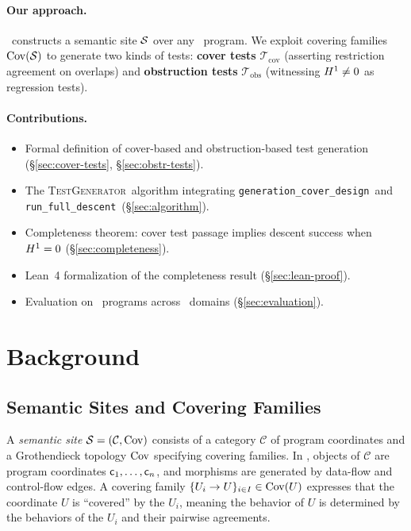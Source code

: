 \documentclass[11pt]{article}
\newcommand{\TestGen}{\textsc{TestGenerator}}
\newcommand{\GenCoverDesign}{\texttt{generation\_cover\_design}}
\newcommand{\RunDescent}{\texttt{run\_full\_descent}}
\newcommand{\CoverSuite}{\mathcal{T}_{\mathrm{cov}}}
\newcommand{\ObstrSuite}{\mathcal{T}_{\mathrm{obs}}}
\begin{document}
\paragraph{Our approach.}
\JuGeo\ constructs a semantic site $\mathcal{S}$ over any \Python\ program.
We exploit covering families $\mathrm{Cov}(\mathcal{S})$ to generate two kinds of tests:
\textbf{cover tests} $\CoverSuite$ (asserting restriction agreement on
overlaps) and \textbf{obstruction tests} $\ObstrSuite$ (witnessing
$H^{1} \neq 0$ as regression tests).

\paragraph{Contributions.}
\begin{itemize}[noitemsep]
  \item Formal definition of cover-based and obstruction-based test
        generation (§\ref{sec:cover-tests}, §\ref{sec:obstr-tests}).
  \item The \TestGen\ algorithm integrating \GenCoverDesign\ and
        \RunDescent\ (§\ref{sec:algorithm}).
  \item Completeness theorem: cover test passage implies descent success
        when $H^{1} = 0$ (§\ref{sec:completeness}).
  \item Lean~4 formalization of the completeness result
        (§\ref{sec:lean-proof}).
  \item Evaluation on \expTotalPrograms\ programs across
        \expDomainCount\ domains (§\ref{sec:evaluation}).
\end{itemize}

\section{Background}\label{sec:background}

\subsection{Semantic Sites and Covering Families}
A \emph{semantic site} $\mathcal{S} = (\mathcal{C}, \mathrm{Cov})$ consists of a category
$\mathcal{C}$ of program coordinates and a Grothendieck topology $\mathrm{Cov}$
specifying covering families.  In \JuGeo, objects of $\mathcal{C}$ are
program coordinates $\mathsf{c}_1, \ldots, \mathsf{c}_n$, and morphisms are
generated by data-flow and control-flow edges.  A covering family
$\{U_i \to U\}_{i \in I} \in \mathrm{Cov}(U)$ expresses that the coordinate $U$
is ``covered'' by the $U_i$, meaning the behavior of $U$ is determined by
the behaviors of the $U_i$ and their pairwise agreements.
\end{document}
